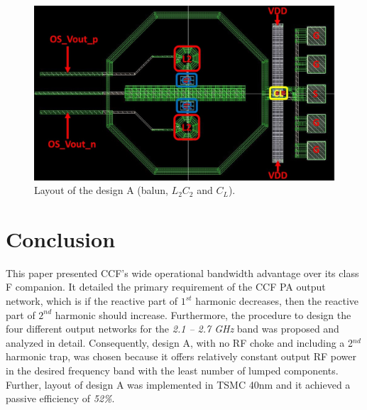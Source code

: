 \documentclass[conference]{IEEEtran}
\begin{document}
\begin{figure}[!t]
\centering
\captionsetup{font=footnotesize}
\includegraphics[width=1\linewidth]{Images/Output_Network_Comp/ON_Pads_BB.jpg}
\caption{Layout of the design A (balun, $L_2C_2$ and $C_L$).}
\label{fig:ON_X1}
\vspace{-0.25in}
\end{figure}



\section{Conclusion}
\label{section:Conclusion}
This paper presented CCF's wide operational bandwidth advantage over its class F companion. It detailed the primary requirement of the CCF PA output network, which is if the reactive part of $1^{st}$ harmonic decreases, then the reactive part of $2^{nd}$ harmonic should increase. Furthermore, the procedure to design the four different output networks for the \textit{2.1 -- 2.7 GHz} band was proposed and analyzed in detail.  Consequently, design A, with no RF choke and  including a 2$^{nd}$ harmonic trap, was chosen because it offers relatively constant output RF power in the desired frequency band with the least number of lumped components. Further, layout of design A was implemented in TSMC 40nm and it achieved a passive efficiency of \textit{52\%}.



\end{document}
